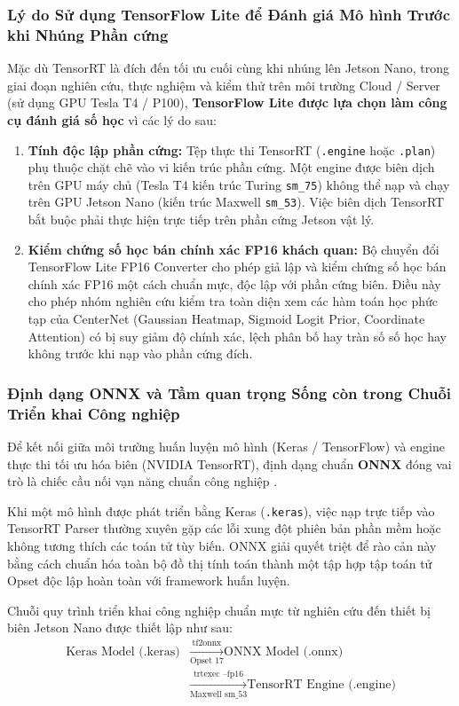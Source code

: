 \documentclass[11pt,a4paper]{article}
\begin{document}
\subsubsection{Lý do Sử dụng TensorFlow Lite để Đánh giá Mô hình Trước khi Nhúng Phần cứng}
Mặc dù TensorRT là đích đến tối ưu cuối cùng khi nhúng lên Jetson Nano, trong giai đoạn nghiên cứu, thực nghiệm và kiểm thử trên môi trường Cloud / Server (sử dụng GPU Tesla T4 / P100), \textbf{TensorFlow Lite được lựa chọn làm công cụ đánh giá số học} vì các lý do sau:
\begin{enumerate}
    \item \textbf{Tính độc lập phần cứng:} Tệp thực thi TensorRT (\texttt{.engine} hoặc \texttt{.plan}) phụ thuộc chặt chẽ vào vi kiến trúc phần cứng. Một engine được biên dịch trên GPU máy chủ (Tesla T4 kiến trúc Turing \texttt{sm\_75}) không thể nạp và chạy trên GPU Jetson Nano (kiến trúc Maxwell \texttt{sm\_53}). Việc biên dịch TensorRT bắt buộc phải thực hiện trực tiếp trên phần cứng Jetson vật lý.
    \item \textbf{Kiểm chứng số học bán chính xác FP16 khách quan:} Bộ chuyển đổi TensorFlow Lite FP16 Converter cho phép giả lập và kiểm chứng số học bán chính xác FP16 một cách chuẩn mực, độc lập với phần cứng biên. Điều này cho phép nhóm nghiên cứu kiểm tra toàn diện xem các hàm toán học phức tạp của CenterNet (Gaussian Heatmap, Sigmoid Logit Prior, Coordinate Attention) có bị suy giảm độ chính xác, lệch phân bố hay tràn số số học hay không trước khi nạp vào phần cứng đích.
\end{enumerate}

\subsubsection{Định dạng ONNX và Tầm quan trọng Sống còn trong Chuỗi Triển khai Công nghiệp}
Để kết nối giữa môi trường huấn luyện mô hình (Keras / TensorFlow) và engine thực thi tối ưu hóa biên (NVIDIA TensorRT), định dạng chuẩn \textbf{ONNX} đóng vai trò là chiếc cầu nối vạn năng chuẩn công nghiệp \cite{bai2019onnx}.

Khi một mô hình được phát triển bằng Keras (\texttt{.keras}), việc nạp trực tiếp vào TensorRT Parser thường xuyên gặp các lỗi xung đột phiên bản phần mềm hoặc không tương thích các toán tử tùy biến. ONNX giải quyết triệt để rào cản này bằng cách chuẩn hóa toàn bộ đồ thị tính toán thành một tập hợp tập toán tử Opset độc lập hoàn toàn với framework huấn luyện.

Chuỗi quy trình triển khai công nghiệp chuẩn mực từ nghiên cứu đến thiết bị biên Jetson Nano được thiết lập như sau:
\begin{equation}
\begin{aligned}
\text{Keras Model (.keras)} &\xrightarrow[\text{Opset 17}]{\text{tf2onnx}} \text{ONNX Model (.onnx)} \\
&\xrightarrow[\text{Maxwell sm\_53}]{\text{trtexec --fp16}} \text{TensorRT Engine (.engine)}
\end{aligned}
\end{equation}
\end{document}

